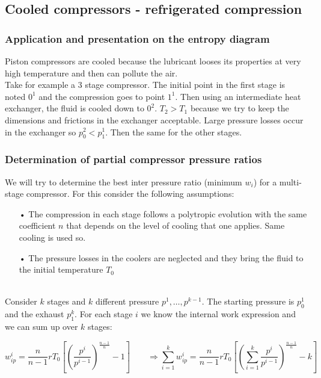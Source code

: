 \subsection{Cooled compressors - refrigerated compression}
\subsubsection{Application and presentation on the entropy diagram}
Piston compressors are cooled because the lubricant looses its properties at very high temperature and then can pollute the air. \\

Take for example a 3 stage compressor. The initial point in the first stage is noted $0^1$ and the compression goes to point $1^1$. Then using an intermediate heat exchanger, the fluid is cooled down to $0^2$. $T_2>T_1$ because we try to keep the dimensions and frictions in the exchanger acceptable. Large pressure losses occur in the exchanger so $p_0^2 < p_1^1$. Then the same for the other stages. 

\subsubsection{Determination of partial compressor pressure ratios}
We will try to determine the best inter pressure ratio (minimum $w_i$) for a multi-stage compressor. For this consider the following assumptions: 

\begin{itemize}
\item[•] The compression in each stage follows a polytropic evolution with the same coefficient $n$ that depends on the level of cooling that one applies. Same cooling is used so. 
\item[•] The pressure losses in the coolers are neglected and they bring the fluid to the initial temperature $T_0$
\end{itemize}

\ \\
Consider $k$ stages and $k$ different pressure $p^1, \dots, p^{k-1}$. The starting pressure is $p_0^1$ and the exhaust $p_1^k$. For each stage $i$ we know the internal work expression and we can sum up over $k$ stages: 

\begin{equation}
w_{ip}^i = \frac{n}{n-1}rT_0\left[ \left(\frac{p^i}{p^{i-1}} \right) ^{\frac{n-1}{n}} -1 \right] \qquad \Rightarrow \sum _{i=1}^k w_{ip}^i = \frac{n}{n-1}rT_0\left[ \left(\sum _{i=1} ^k\frac{p^i}{p^{i-1}} \right) ^{\frac{n-1}{n}} -k \right]
\end{equation}

